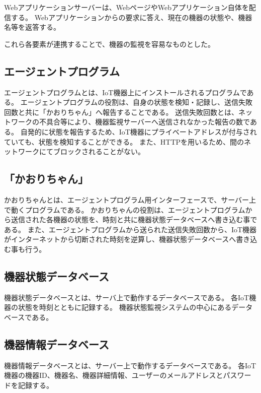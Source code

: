 Webアプリケーションサーバーは、WebページやWebアプリケーション自体を配信する。
Webアプリケーションからの要求に答え、現在の機器の状態や、機器名等を返答する。
\medskip

これら各要素が連携することで、機器の監視を容易なものとした。

\subsection{エージェントプログラム}
エージェントプログラムとは、IoT機器上にインストールされるプログラムである。
エージェントプログラムの役割は、自身の状態を検知・記録し、送信失敗回数と共に「かおりちゃん」へ報告することである。
送信失敗回数とは、ネットワークの不具合等により、機器監視サーバーへ送信されなかった報告の数である。
自発的に状態を報告するため、IoT機器にプライベートアドレスが付与されていても、状態を検知することができる。
また、HTTPを用いるため、間のネットワークにてブロックされることがない。

\subsection{「かおりちゃん」}
かおりちゃんとは、エージェントプログラム用インターフェースで、サーバー上で動くプログラムである。
かおりちゃんの役割は、エージェントプログラムから送信された各機器の状態を、時刻と共に機器状態データベースへ書き込む事である。
また、エージェントプログラムから送られた送信失敗回数から、IoT機器がインターネットから切断された時刻を逆算し、機器状態データベースへ書き込む事も行う。


\subsection{機器状態データベース}
機器状態データベースとは、サーバ上で動作するデータベースである。
各IoT機器の状態を時刻とともに記録する。
機器状態監視システムの中心にあるデータベースである。

\subsection{機器情報データベース}
機器情報データベースとは、サーバー上で動作するデータベースである。
各IoT機器の機器ID、機器名、機器詳細情報、ユーザーのメールアドレスとパスワードを記録する。

